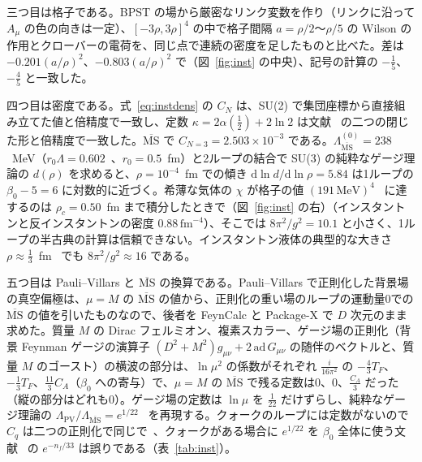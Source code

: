 \documentclass[a4paper,10pt]{ltjsarticle}
\newcommand{\dd}{\mathrm{d}}
\newcommand{\MSbar}{\overline{\mathrm{MS}}}
\begin{document}
三つ目は格子である。BPST の場から厳密なリンク変数を作り（リンクに沿って $A_\mu$ の色の向きは一定）、$[-3\rho,3\rho]^4$ の中で格子間隔 $a=\rho/2$〜$\rho/5$ の Wilson の作用とクローバーの電荷を、同じ点で連続の密度を足したものと比べた。差は $-0.201(a/\rho)^2$、$-0.803(a/\rho)^2$ で（図~\ref{fig:inst} の中央）、記号の計算の $-\frac15$、$-\frac45$ と一致した。

四つ目は密度である。式~\eqref{eq:instdens} の $C_N$ は、SU(2) で集団座標から直接組み立てた値と倍精度で一致し、定数 $\kappa=2\alpha(\frac12)+2\ln2$ は文献~\cite{dhlm05b,fm25} の二つの閉じた形と倍精度で一致した。$\MSbar$ で $C_{N=3}=2.503\times10^{-3}$ である。$\Lambda^{(0)}_{\MSbar}=238$~MeV（$r_0\Lambda=0.602$~\cite{clsw99}、$r_0=0.5$~fm）と2ループの結合で SU(3) の純粋なゲージ理論の $d(\rho)$ を求めると、$\rho=10^{-4}$~fm での傾き $\dd\ln d/\dd\ln\rho=5.84$ は1ループの $\beta_0-5=6$ に対数的に近づく。希薄な気体の $\chi$ が格子の値 $(191\,\mathrm{MeV})^4$~\cite{dgp05} に達するのは $\rho_c=0.50$~fm まで積分したときで（図~\ref{fig:inst} の右）（インスタントンと反インスタントンの密度 $0.88\,\mathrm{fm}^{-4}$）、そこでは $8\pi^2/g^2=10.1$ と小さく、1ループの半古典の計算は信頼できない。インスタントン液体の典型的な大きさ $\rho\approx\frac13$~fm~\cite{ss98} でも $8\pi^2/g^2\approx16$ である。

五つ目は Pauli--Villars と $\MSbar$ の換算である。Pauli--Villars で正則化した背景場の真空偏極は、$\mu=M$ の $\MSbar$ の値から、正則化の重い場のループの運動量0での $\MSbar$ の値を引いたものなので、後者を FeynCalc と Package-X で $D$ 次元のまま求めた。質量 $M$ の Dirac フェルミオン、複素スカラー、ゲージ場の正則化（背景 Feynman ゲージの演算子 $(D^2+M^2)g_{\mu\nu}+2\,\mathrm{ad}\,G_{\mu\nu}$ の随伴のベクトルと、質量 $M$ のゴースト）の横波の部分は、$\ln\mu^2$ の係数がそれぞれ $\frac{i}{16\pi^2}$ の $-\frac43T_F$、$-\frac13T_F$、$\frac{11}3C_A$（$\beta_0$ への寄与）で、$\mu=M$ の $\MSbar$ で残る定数は0、0、$\frac{C_A}3$ だった（縦の部分はどれも0）。ゲージ場の定数は $\ln\mu$ を $\frac1{22}$ だけずらし、純粋なゲージ理論の $\Lambda_{\mathrm{PV}}/\Lambda_{\MSbar}=e^{1/22}$~\cite{hh81} を再現する。クォークのループには定数がないので $C_q$ は二つの正則化で同じで~\cite{thooft86,np94}、クォークがある場合に $e^{1/22}$ を $\beta_0$ 全体に使う文献~\cite{bn20,fm25} の $e^{-n_f/33}$ は誤りである（表~\ref{tab:inst}）。
\end{document}
